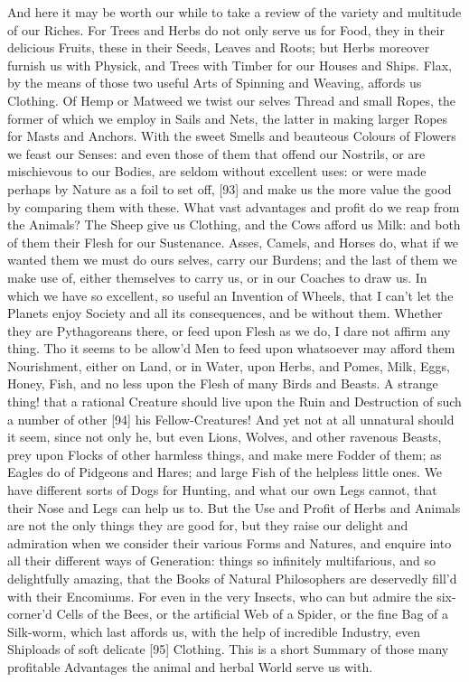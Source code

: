 \documentclass[letterpaper]{book}
\begin{document}
And here it may be worth our while to take a review of the variety and
multitude of our Riches. For Trees and Herbs do not only serve us for Food,
they in their delicious Fruits, these in their Seeds, Leaves and Roots; but
Herbs moreover furnish us with Physick, and Trees with Timber for our Houses
and Ships. Flax, by the means of those two useful Arts of Spinning and
Weaving, affords us Clothing. Of Hemp or Matweed we twist our selves Thread
and small Ropes, the former of which we employ in Sails and Nets, the latter
in making larger Ropes for Masts and Anchors. With the sweet Smells and
beauteous Colours of Flowers we feast our Senses: and even those of them
that offend our Nostrils, or are mischievous to our Bodies, are seldom
without excellent uses: or were made perhaps by Nature as a foil to set off,
[93] and make us the more value the good by comparing them with these. What
vast advantages and profit do we reap from the Animals? The Sheep give us
Clothing, and the Cows afford us Milk: and both of them their Flesh for our
Sustenance. Asses, Camels, and Horses do, what if we wanted them we must do
ours selves, carry our Burdens; and the last of them we make use of, either
themselves to carry us, or in our Coaches to draw us. In which we have so
excellent, so useful an Invention of Wheels, that I can't let the Planets
enjoy Society and all its consequences, and be without them. Whether they
are Pythagoreans there, or feed upon Flesh as we do, I dare not affirm any
thing. Tho it seems to be allow'd Men to feed upon whatsoever may afford
them Nourishment, either on Land, or in Water, upon Herbs, and Pomes, Milk,
Eggs, Honey, Fish, and no less upon the Flesh of many Birds and Beasts. A
strange thing! that a rational Creature should live upon the Ruin and
Destruction of such a number of other [94] his Fellow-Creatures! And yet not
at all unnatural should it seem, since not only he, but even Lions, Wolves,
and other ravenous Beasts, prey upon Flocks of other harmless things, and
make mere Fodder of them; as Eagles do of Pidgeons and Hares; and large Fish
of the helpless little ones. We have different sorts of Dogs for Hunting,
and what our own Legs cannot, that their Nose and Legs can help us to. But
the Use and Profit of Herbs and Animals are not the only things they are
good for, but they raise our delight and admiration when we consider their
various Forms and Natures, and enquire into all their different ways of
Generation: things so infinitely multifarious, and so delightfully amazing,
that the Books of Natural Philosophers are deservedly fill'd with their
Encomiums. For even in the very Insects, who can but admire the six-corner'd
Cells of the Bees, or the artificial Web of a Spider, or the fine Bag of a
Silk-worm, which last affords us, with the help of incredible Industry, even
Shiploads of soft delicate [95] Clothing. This is a short Summary of those
many profitable Advantages the animal and herbal World serve us with.
\end{document}
